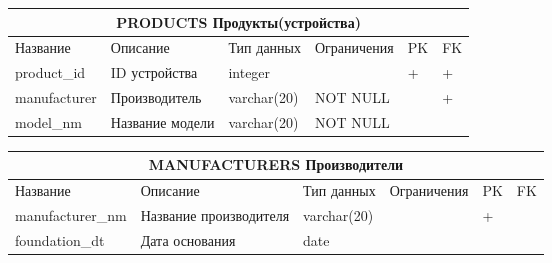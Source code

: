 \documentclass{article}
\begin{document}
\begin{tabular}{ |p{4cm}|p{4cm}|p{2.5cm}|p{3.5cm}|p{2cm}|p{1cm}| }
\hline
\multicolumn{6}{|c|}{PRODUCTS Продукты(устройства)} \\
\hline
Название & Описание & Тип данных & Ограничения & PK & FK\\
\hline
product\_id                         &   %
ID устройства                       &   %
integer                             &   %
                                    &   %
 +                                  &   %
 +                                  \\  %
\hline
manufacturer                        &   %
Производитель                       &   %
varchar(20)                         &   %
NOT NULL                            &   %
                                    &   %
 +                                  \\  %
\hline
model\_nm                           &   %
Название модели                     &   %
varchar(20)                         &   %
NOT NULL                            &   %
                                    &   %
                                    \\  %
\hline
\end{tabular}

\begin{tabular}{ |p{4cm}|p{4cm}|p{2.5cm}|p{3.5cm}|p{2cm}|p{1cm}| }
\hline
\multicolumn{6}{|c|}{MANUFACTURERS Производители} \\
\hline
Название & Описание & Тип данных & Ограничения & PK & FK\\
\hline
manufacturer\_nm                    &   %
Название производителя              &   %
varchar(20)                         &   %
                                    &   %
 +                                  &   %
                                    \\  %
\hline
foundation\_dt                      &   %
Дата основания                      &   %
date                                &   %
                                    &   %
                                    &   %
                                    \\  %
\hline
\end{tabular}
\end{document}

